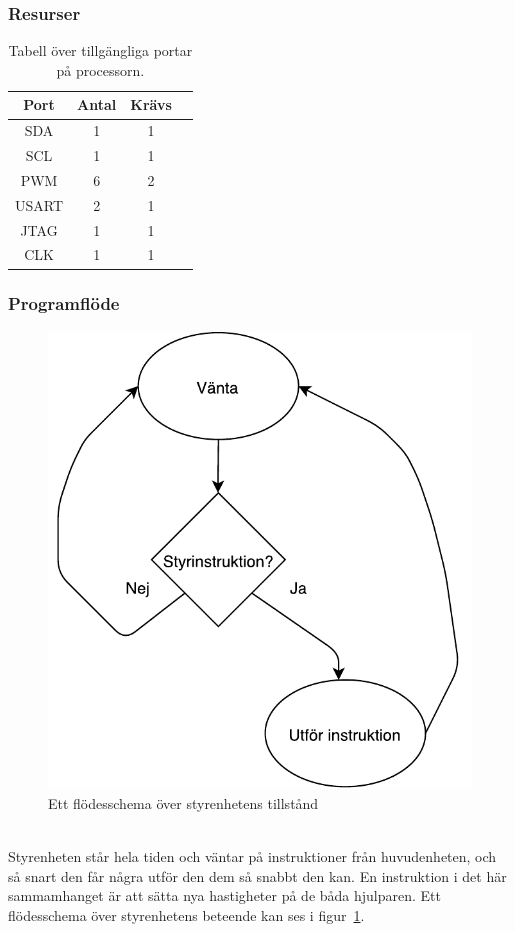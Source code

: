 \documentclass{article}
\begin{document}
\subsubsection{Resurser}
\begin{table}[H]
  \centering
  \begin{tabular}{ | c | c | c | c |}
    \hline
    \textbf{Port} & \textbf{Antal} & \textbf{Krävs} \\
    \hline
    SDA & 1 & 1 \\
    \hline
    SCL & 1 & 1 \\
    \hline
    PWM & 6 & 2 \\
    \hline
    USART & 2 & 1 \\
    \hline
    JTAG & 1 & 1 \\
    \hline
    CLK & 1 & 1 \\
    \hline
  \end{tabular}
  \caption{Tabell över tillgängliga portar på processorn.}
\end{table}

\subsubsection{Programflöde}

\begin{figure}[H]
\centering
\includegraphics[scale=0.6]{styrenhet_flowchart}
\caption{Ett flödesschema över styrenhetens tillstånd}
\label{fig:styrenhet_flowchart}
\end{figure}
\ \\
Styrenheten står hela tiden och väntar på instruktioner från huvudenheten, och så snart den får några utför den dem så snabbt den kan. En instruktion i det här sammamhanget är att sätta nya hastigheter på de båda hjulparen. Ett flödesschema över styrenhetens beteende kan ses i figur~\ref{fig:styrenhet_flowchart}.
\end{document}
